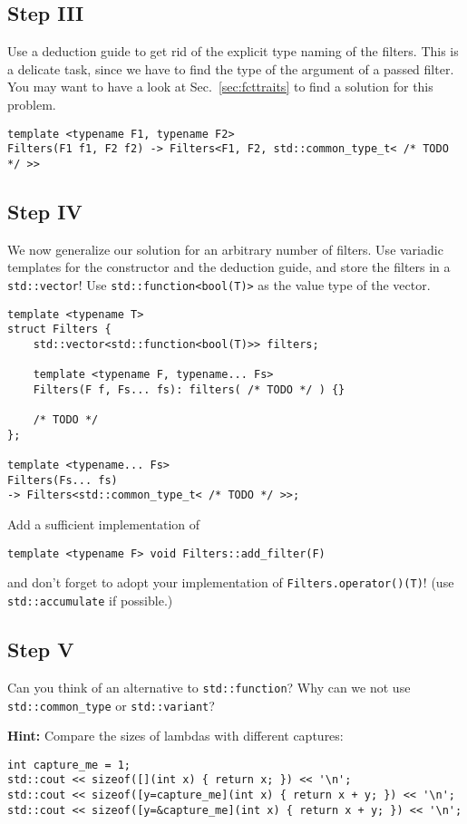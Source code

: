 \subsection{Step III}
Use a deduction guide to get rid of the explicit type naming of the filters. This is a delicate task, since we have to find the type of the argument of a passed filter. You may want to have a look at Sec.~\ref{sec:fcttraits} to find a solution for this problem.
\begin{lstlisting}
template <typename F1, typename F2>
Filters(F1 f1, F2 f2) -> Filters<F1, F2, std::common_type_t< /* TODO */ >>
\end{lstlisting}

\subsection{Step IV}
We now generalize our solution for an arbitrary number of filters. Use variadic templates for the constructor and the deduction guide, and store the filters in a \texttt{std::vector}! Use \texttt{std::function<bool(T)>} as the value type of the vector.

\begin{lstlisting}
template <typename T>
struct Filters {
    std::vector<std::function<bool(T)>> filters;

    template <typename F, typename... Fs>
    Filters(F f, Fs... fs): filters( /* TODO */ ) {}
    
    /* TODO */
};

template <typename... Fs>
Filters(Fs... fs)
-> Filters<std::common_type_t< /* TODO */ >>;
\end{lstlisting}
Add a sufficient implementation of
\begin{lstlisting}
template <typename F> void Filters::add_filter(F)
\end{lstlisting}
and don't forget to adopt your implementation of \texttt{Filters.operator()(T)}! (use \texttt{std::accumulate} if possible.)

\subsection{Step V}
Can you think of an alternative to \texttt{std::function}? Why can we not use \texttt{std::common\_type} or \texttt{std::variant}?

\textbf{Hint:} Compare the sizes of lambdas with different captures:
\begin{lstlisting}[title=\href{https://godbolt.org/z/ZBUfgY}{\texttt{godbolt.org/z/ZBUfgY}}]
int capture_me = 1;
std::cout << sizeof([](int x) { return x; }) << '\n';
std::cout << sizeof([y=capture_me](int x) { return x + y; }) << '\n';
std::cout << sizeof([y=&capture_me](int x) { return x + y; }) << '\n';
\end{lstlisting}

